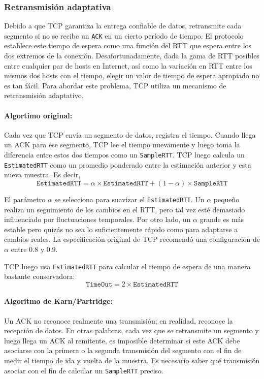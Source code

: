 \subsubsection{Retransmisión adaptativa}
Debido a que TCP garantiza la entrega confiable de datos, retransmite cada segmento si no se recibe un \texttt{ACK} en un cierto período de tiempo. El protocolo establece este tiempo de espera como una función del RTT que espera entre los dos extremos de la conexión. Desafortunadamente, dada la gama de RTT posibles entre cualquier par de hosts en Internet, así como la variación en RTT entre los mismos dos hosts con el tiempo, elegir un valor de tiempo de espera apropiado no es tan fácil. Para abordar este problema, TCP utiliza un mecanismo de retransmisión adaptativo.

\paragraph{Algortimo original:} Cada vez que TCP envía un segmento de datos, registra el tiempo. Cuando llega un ACK para ese segmento, TCP lee el tiempo nuevamente y luego toma la diferencia entre estos dos tiempos como un \texttt{SampleRTT}. TCP luego calcula un \texttt{EstimatedRTT} como un promedio ponderado entre la estimación anterior y esta nueva muestra. Es decir,
  \[ \texttt{EstimatedRTT} = \alpha\times \texttt{EstimatedRTT} + (1-\alpha)\times \texttt{SampleRTT} \]

El parámetro \(\alpha\) se selecciona para suavizar el \texttt{EstimatedRTT}. Un \(\alpha\) pequeño realiza un seguimiento de los cambios en el RTT, pero tal vez esté demasiado influenciado por fluctuaciones temporales. Por otro lado, un \(\alpha\) grande es más estable pero quizás no sea lo suficientemente rápido como para adaptarse a cambios reales. La especificación original de TCP recomendó una configuración de \(\alpha\) entre \(0.8\) y \(0.9\).

TCP luego usa \texttt{EstimatedRTT} para calcular el tiempo de espera de una manera bastante conservadora:
\[ \texttt{TimeOut} = 2\times \texttt{EstimatedRTT}\]

\paragraph{Algoritmo de Karn/Partridge:} Un ACK no reconoce realmente una transmisión; en realidad, reconoce la recepción de datos. En otras palabras, cada vez que se retransmite un segmento y luego llega un ACK al remitente, es imposible determinar si este ACK debe asociarse con la primera o la segunda transmisión del segmento con el fin de medir el tiempo de ida y vuelta de la muestra. Es necesario saber qué transmisión asociar con el fin de calcular un \texttt{SampleRTT} preciso.  

